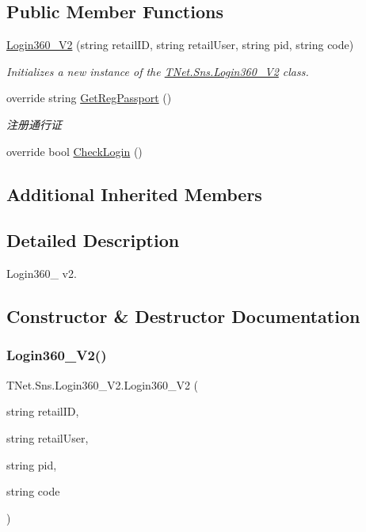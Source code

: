 \subsection*{Public Member Functions}
\begin{DoxyCompactItemize}
\item 
\mbox{\hyperlink{class_t_net_1_1_sns_1_1_login360___v2_aed8bc716e7f930bb5f08df375f5ac997}{Login360\+\_\+\+V2}} (string retail\+ID, string retail\+User, string pid, string code)
\begin{DoxyCompactList}\small\item\em Initializes a new instance of the \mbox{\hyperlink{class_t_net_1_1_sns_1_1_login360___v2}{T\+Net.\+Sns.\+Login360\+\_\+\+V2}} class. \end{DoxyCompactList}\item 
override string \mbox{\hyperlink{class_t_net_1_1_sns_1_1_login360___v2_a81e62cff8c92b5b35e922e2948202d8a}{Get\+Reg\+Passport}} ()
\begin{DoxyCompactList}\small\item\em 注册通行证 \end{DoxyCompactList}\item 
override bool \mbox{\hyperlink{class_t_net_1_1_sns_1_1_login360___v2_a2f0d6e19eeca9cf6e86522568767eec1}{Check\+Login}} ()
\end{DoxyCompactItemize}
\subsection*{Additional Inherited Members}


\subsection{Detailed Description}
Login360\+\_\+ v2. 



\subsection{Constructor \& Destructor Documentation}
\mbox{\label{class_t_net_1_1_sns_1_1_login360___v2_aed8bc716e7f930bb5f08df375f5ac997}} 
\subsubsection{\texorpdfstring{Login360\+\_\+\+V2()}{Login360\_V2()}}
{\footnotesize\ttfamily T\+Net.\+Sns.\+Login360\+\_\+\+V2.\+Login360\+\_\+\+V2 (\begin{DoxyParamCaption}\item[{string}]{retail\+ID,  }\item[{string}]{retail\+User,  }\item[{string}]{pid,  }\item[{string}]{code }\end{DoxyParamCaption})}



